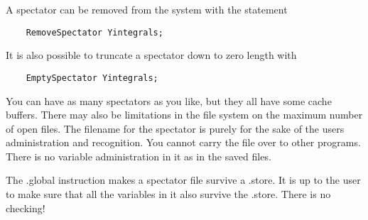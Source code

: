 A spectator can be removed from the system with the 
statement
\begin{verbatim}
    RemoveSpectator Yintegrals;
\end{verbatim}
It is also possible to truncate a spectator down to zero length 
with
\begin{verbatim}
    EmptySpectator Yintegrals;
\end{verbatim}
You can have as many spectators as you like, but they all have some cache 
buffers. There may also be limitations in the file system on the maximum 
number of open files. The filename for the spectator is purely for the sake 
of the users administration and recognition. You cannot carry the file over 
to other programs. There is no variable administration in it as in the 
saved files.

The .global instruction makes a spectator file survive a .store. It is up 
to the user to make sure that all the variables in it also survive the 
.store. There is no checking!

